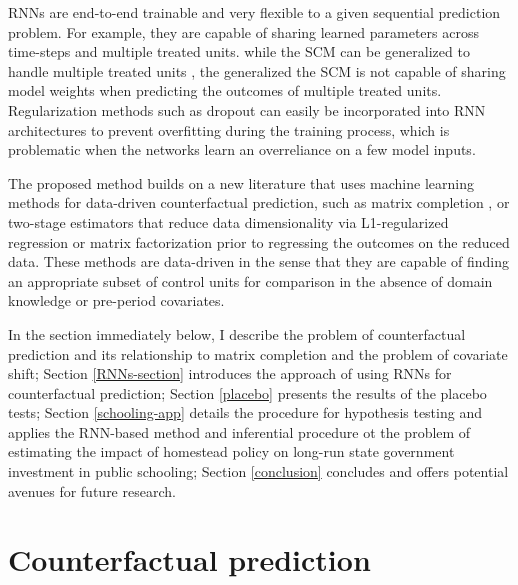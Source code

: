RNNs are end-to-end trainable and very flexible to a given sequential prediction problem. For example, they are capable of sharing learned parameters across time-steps and multiple treated units. while the SCM can be generalized to handle multiple treated units \citep[e.g.,][]{dube2015pooling,xu2017generalized}, the generalized the SCM is not capable of sharing model weights when predicting the outcomes of multiple treated units. Regularization methods such as dropout can easily be incorporated into RNN architectures to prevent overfitting during the training process, which is problematic when the networks learn an overreliance on a few model inputs.

The proposed method builds on a new literature that uses machine learning methods for data-driven counterfactual prediction, such as matrix completion \citep{athey2017matrix}, or two-stage estimators that reduce data dimensionality via L1-regularized regression \citep{doudchenko2016balancing,carvalho2018arco} or matrix factorization \citep{amjad2018robust} prior to regressing the outcomes on the reduced data. These methods are data-driven in the sense that they are capable of finding an appropriate subset of control units for comparison in the absence of domain knowledge or pre-period covariates. 

In the section immediately below, I describe the problem of counterfactual prediction and its relationship to matrix completion and the problem of covariate shift; Section \ref{RNNs-section} introduces the approach of using RNNs for counterfactual prediction; Section \ref{placebo} presents the results of the placebo tests; Section \ref{schooling-app} details the procedure for hypothesis testing and applies the RNN-based method and inferential procedure ot the problem of estimating the impact of homestead policy on long-run state government investment in public schooling; Section \ref{conclusion} concludes and offers potential avenues for future research. 

\section{Counterfactual prediction} \label{prediction}

